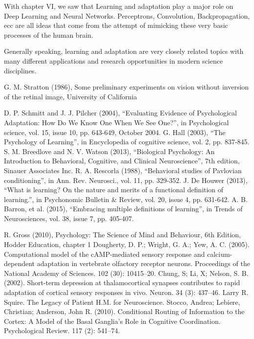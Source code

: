 \documentclass[conference]{IEEEtran}
\begin{document}
	With chapter VI, we saw that Learning and adaptation play a major role on Deep Learning and Neural Networks. Perceptrons, Convolution, Backpropagation, ecc are all ideas that come from the attempt of mimicking these very basic processes of the human brain.

	Generally speaking, learning and adaptation are very closely related topics with many different applications and research opportunities in modern science disciplines.

\begin{thebibliography}{00}
 G. M. Stratton (1986), Some preliminary experiments on vision without inversion of the retinal image, University of California

 D. P. Schmitt and J. J. Pilcher (2004), “Evaluating Evidence of Psychological Adaptation: How Do We Know One When We See One?”, in Psychological science, vol. 15, issue 10, pp. 643-649, October 2004.
 G. Hall (2003), “The Psychology of Learning”, in Encyclopedia of cognitive science, vol. 2, pp. 837-845.
 S. M. Breedlove and N. V. Watson (2013), “Biological Psychology: An Introduction to Behavioral, Cognitive, and Clinical Neuroscience”, 7th edition, Sinauer Associates Inc.
 R. A. Rescorla (1988), “Behavioral studies of Pavlovian conditioning”, in Ann. Rev. Neurosci., vol. 11, pp. 329-352.
 J. De Houwer (2013), “What is learning? On the nature and merits of a functional definition of learning.”, in Psychonomic Bulletin \& Review, vol. 20, issue 4, pp. 631-642.
 A. B. Barron, et al. (2015), “Embracing multiple definitions of learning”, in Trends of Neurosciences, vol. 38, issue 7, pp. 405-407.

 R. Gross (2010), Psychology: The Science of Mind and Behaviour, 6th Edition, Hodder Education, chapter 1
 Dougherty, D. P.; Wright, G. A.; Yew, A. C. (2005). Computational model of the cAMP-mediated sensory response and calcium-dependent adaptation in vertebrate olfactory receptor neurons. Proceedings of the National Academy of Sciences. 102 (30): 10415–20.
 Chung, S; Li, X; Nelson, S. B. (2002). Short-term depression at thalamocortical synapses contributes to rapid adaptation of cortical sensory responses in vivo. Neuron. 34 (3): 437–46.
 Larry R. Squire. The Legacy of Patient H.M. for Neuroscience.
 Stocco, Andrea; Lebiere, Christian; Anderson, John R. (2010). Conditional Routing of Information to the Cortex: A Model of the Basal Ganglia's Role in Cognitive Coordination. Psychological Review. 117 (2): 541–74.


\end{thebibliography}
\end{document}
